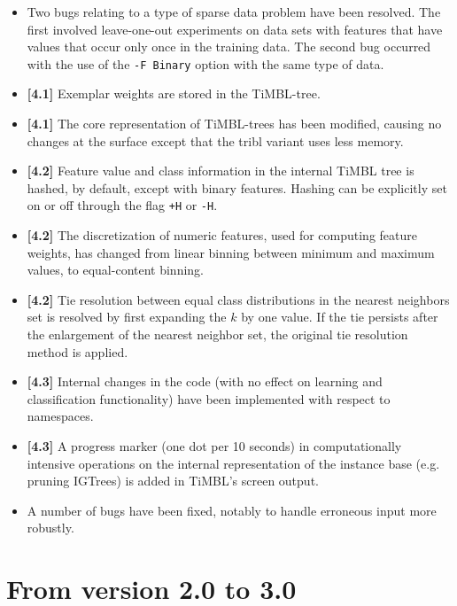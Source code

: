 \documentclass{book}
\begin{document}
\begin{itemize}
\item Two bugs relating to a type of sparse data problem have been
resolved. The first involved leave-one-out experiments on data sets
with features that have values that occur only once in the training
data. The second bug occurred with the use of the {\tt -F Binary}
option with the same type of data.

\item {\bf [4.1]} Exemplar weights are stored in the TiMBL-tree.

\item {\bf [4.1]} The core representation of
TiMBL-trees has been modified, causing no changes at the surface
except that the {\sc tribl} variant uses less memory.

\item {\bf [4.2]} Feature value and class information in the internal
TiMBL tree is hashed, by default, except with binary features. Hashing
can be explicitly set on or off through the flag {\tt +H} or {\tt -H}.

\item {\bf [4.2]} The discretization of numeric
features, used for computing feature weights, has changed from linear
binning between minimum and maximum values, to equal-content binning.

\item {\bf [4.2]} Tie resolution between equal
class distributions in the nearest neighbors set is resolved by first
expanding the $k$ by one value. If the tie persists after the
enlargement of the nearest neighbor set, the original tie resolution
method is applied.

\item {\bf [4.3]} Internal changes in the code (with no effect on
learning and classification functionality) have been implemented with
respect to namespaces.

\item {\bf [4.3]} A progress marker (one dot per 10 seconds) in
computationally intensive operations on the internal representation of
the instance base (e.g. pruning {\sc IGTree}s) is added in TiMBL's
screen output.

\item A number of bugs have been fixed, notably to handle erroneous
input more robustly.

\end{itemize}

\section{From version 2.0 to 3.0}
\end{document}
